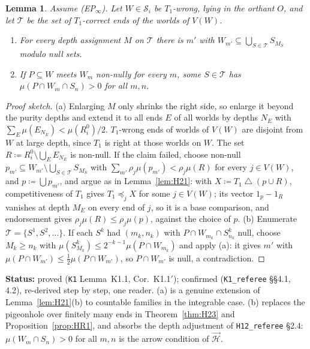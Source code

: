 \documentclass[11pt]{article}
\newtheorem{lemma}[theorem]{Lemma}
\theoremstyle{definition}
\theoremstyle{remark}
\newcommand{\sd}{\mathbin{\triangle}}
\newcommand{\src}[1]{\texttt{#1}}
\newcommand{\status}[1]{\par\smallskip\noindent\textbf{Status:} #1\par\smallskip}
\begin{document}
\begin{lemma}\label{lem:K11}
Assume (EP$_\infty$). Let $W\in\mathcal S_i$ be $T_1$-wrong, lying in the orthant $O$, and let $\mathcal T$ be the set of $T_1$-correct ends of the worlds of $V(W)$.
\begin{enumerate}[leftmargin=*,label=(\alph*)]
\item For every depth assignment $M$ on $\mathcal T$ there is $m'$ with $W_{m'}\subseteq\bigcup_{S\in\mathcal T}S_{M_S}$ modulo null sets.
\item If $P\subseteq W$ meets $W_m$ non-nully for every $m$, some $S\in\mathcal T$ has $\mu(P\cap W_m\cap S_n)>0$ for all $m,n$.
\end{enumerate}
\end{lemma}
\begin{proof}[Proof sketch]
(a) Enlarging $M$ only shrinks the right side, so enlarge it beyond the purity depths and extend it to all ends $E$ of all worlds by depths $N_E$ with $\sum_E\mu(E_{N_E})<\mu(R^0_i)/2$. $T_1$-wrong ends of worlds of $V(W)$ are disjoint from $W$ at large depth, since $T_1$ is right at those worlds on $W$. The set $R\coloneqq R^0_i\setminus\bigcup_EE_{N_E}$ is non-null. If the claim failed, choose non-null $p_{m'}\subseteq W_{m'}\setminus\bigcup_{S\in\mathcal T}S_{M_S}$ with $\sum_{m'}\rho_j\mu(p_{m'})<\rho_j\mu(R)$ for every $j\in V(W)$, and $p\coloneqq\bigcup p_{m'}$, and argue as in Lemma~\ref{lem:H21}: with $X\coloneqq T_1\sd(p\cup R)$, competitiveness of $T_1$ gives $T_1\preceq_jX$ for some $j\in V(W)$; its vector $1_p-1_R$ vanishes at depth $M_E$ on every end of $j$, so it is a base comparison, and endorsement gives $\rho_j\mu(R)\le\rho_j\mu(p)$, against the choice of $p$. (b) Enumerate $\mathcal T=\{S^1,S^2,\dots\}$. If each $S^k$ had $(m_k,n_k)$ with $P\cap W_{m_k}\cap S^k_{n_k}$ null, choose $M_k\ge n_k$ with $\mu(S^k_{M_k})\le2^{-k-1}\mu(P\cap W_{m_k})$ and apply (a): it gives $m'$ with $\mu(P\cap W_{m'})\le\frac12\mu(P\cap W_{m'})$, so $P\cap W_{m'}$ is null, a contradiction.
\end{proof}
\status{proved (\src{K1} Lemma~K1.1, Cor.~K1.1$'$); confirmed (\src{K1\_referee} \S\S4.1, 4.2), re-derived step by step, one reader. (a) is a genuine extension of Lemma~\ref{lem:H21}(b) to countable families in the integrable case. (b) replaces the pigeonhole over finitely many ends in Theorem~\ref{thm:H23} and Proposition~\ref{prop:HR1}, and absorbs the depth adjustment of \src{H12\_referee} \S2.4: $\mu(W_m\cap S_n)>0$ for all $m,n$ is the arrow condition of $\vec{\mathcal H}$.}
\end{document}

